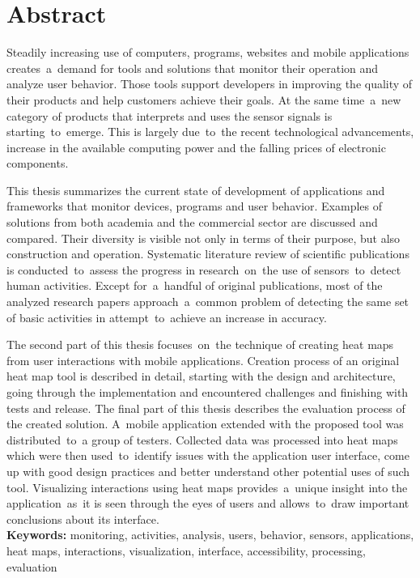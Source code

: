 \chapter*{Abstract}
Steadily increasing use of computers, programs, websites and mobile applications creates~a~demand for tools and solutions that monitor their operation and analyze user behavior. Those tools support developers in improving the quality of their products and help customers achieve their goals. At the same time~a~new category of products that interprets and uses the sensor signals is starting~to~emerge. This is largely due~to~the recent technological advancements, increase in the available computing power and the falling prices of electronic components.

This thesis summarizes the current state of development of applications and frameworks that monitor devices, programs and user behavior. Examples of solutions from both academia and the commercial sector are discussed and compared. Their diversity is visible not only in terms of their purpose, but also construction and operation. Systematic literature review of scientific publications is conducted~to~assess the progress in research~on~the use of sensors~to~detect human activities. Except for~a~handful of original publications, most of the analyzed research papers approach~a~common problem of detecting the same set of basic activities in attempt~to~achieve an increase in accuracy.

The second part of this thesis focuses~on~the technique of creating heat maps from user interactions with mobile applications. Creation process of an original heat map tool is described in detail, starting with the design and architecture, going through the implementation and encountered challenges and finishing with tests and release. The final part of this thesis describes the evaluation process of the created solution. A~mobile application extended with the proposed tool was distributed~to~a group of testers. Collected data was processed into heat maps which were then used~to~identify issues with the application user interface, come up with good design practices and better understand other potential uses of such tool. Visualizing interactions using heat maps provides~a~unique insight into the application~as~it is seen through the eyes of users and allows~to~draw important conclusions about its interface. \\

\noindent\textbf{Keywords:} monitoring, activities, analysis, users, behavior, sensors, applications, heat maps, interactions, visualization, interface, accessibility, processing, evaluation
